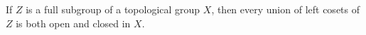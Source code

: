 If $Z$ is a full subgroup of a topological group $X$, then every union of left cosets of $Z$ is both open and closed in $X$.

